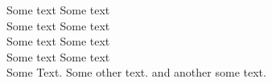 \documentclass[12pt, a4paper, onecolumn]{article}
\begin{document}
	\noindent
	Some text \hfil Some text\\
	Some text \hfil Some text\\
	Some text \hfil Some text\\
	Some text \hfil Some text\\
	
	
	Some Text. \vfil Some other text. \vfil and another some text.
	
\end{document}
